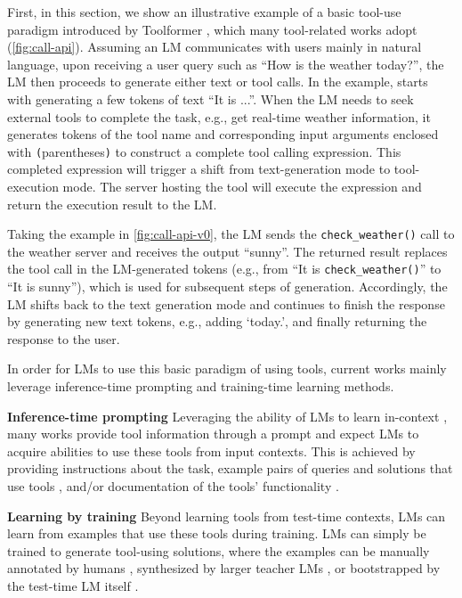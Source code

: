 First, in this section, we show an illustrative example of a basic tool-use paradigm introduced by Toolformer \citep{schick2023toolformer}, which many tool-related works adopt (\autoref{fig:call-api}). Assuming an LM communicates with users mainly in natural language, upon receiving a user query such as ``How is the weather today?'', the LM then proceeds to generate either text or tool calls. In the example, starts with generating a few tokens of text ``It is ...''. When the LM needs to seek external tools to complete the task, e.g., get real-time weather information, it generates tokens of the tool name and corresponding input arguments enclosed with \texttt{(}parentheses\texttt{)} to construct a complete tool calling expression. 
This completed expression will trigger a shift from text-generation mode to tool-execution mode. The server hosting the tool will execute the expression and return the execution result to the LM. 

Taking the example in \autoref{fig:call-api-v0}, the LM sends the \texttt{check\_weather()} call to the weather server and receives the output ``sunny''. The returned result replaces the tool call in the LM-generated tokens (e.g., from ``It is \texttt{check\_weather()}'' to ``It is sunny''), which is used for subsequent steps of generation.
Accordingly, the LM shifts back to the text generation mode and continues to finish the response by generating new text tokens, e.g., adding `today.', and finally returning the response to the user.

In order for LMs to use this basic paradigm of using tools, current works mainly leverage inference-time prompting and training-time learning methods.

\noindent \textbf{Inference-time prompting} \quad
Leveraging the ability of LMs to learn in-context \citep{}, many works provide tool information through a prompt and expect LMs to acquire abilities to use these tools from input contexts.
This is achieved by providing instructions about the task, example pairs of queries and solutions that use tools \citep{gupta2022visual,lu2023chameleon,paranjape2023art,shen2023hugginggpt,yang2023mmreact}, and/or documentation of the tools' functionality \citep{hsieh2023tool}.


\noindent \textbf{Learning by training} \quad
Beyond learning tools from test-time contexts, LMs can learn from examples that use these tools during training.
LMs can simply be trained to generate tool-using solutions, where the examples can be manually annotated by humans \citep{li-etal-2023-api}, synthesized by larger teacher LMs \citep{tang2023toolalpaca,qin2023toolllm,huang2024metatool}, or bootstrapped by the test-time LM itself \citep{schick2023toolformer}.
